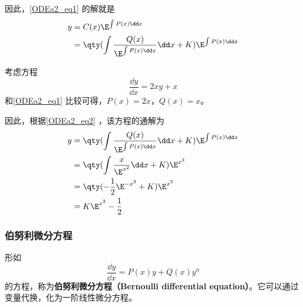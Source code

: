 因此，\autoref{ODEa2_eq1} 的解就是
\begin{equation}\label{ODEa2_eq2}
\begin{aligned}
y&=C(x)\E^{\int P(x)\dd x}\\
&=\qty(\int\frac{Q(x)}{\E^{\int P(x)\dd x}}\dd x+K)\E^{\int P(x)\dd x}
\end{aligned}
\end{equation}

\begin{example}{}
考虑方程
\begin{equation}
\frac{\dd y}{\dd x}=2xy+x
\end{equation}
和\autoref{ODEa2_eq1} 比较可得，$P(x)=2x$，$Q(x)=x$。

因此，根据\autoref{ODEa2_eq2} ，该方程的通解为
\begin{equation}
\begin{aligned}
y&=\qty(\int\frac{Q(x)}{\E^{\int P(x)\dd x}}\dd x+K)\E^{\int P(x)\dd x}\\
&=\qty(\int\frac{x}{\E^{x^2}}\dd x+K)\E^{x^2}\\
&=\qty(-\frac{1}{2}\E^{-x^2}+K)\E^{x^2}\\
&=K\E^{x^2}-\frac{1}{2}
\end{aligned}
\end{equation}
\end{example}

\subsubsection{伯努利微分方程}
形如
\begin{equation}
\frac{\dd y}{\dd x}=P(x)y+Q(x)y^n
\end{equation}
的方程，称为\textbf{伯努利微分方程（Bernoulli differential equation）}。它可以通过变量代换，化为一阶线性微分方程。



















